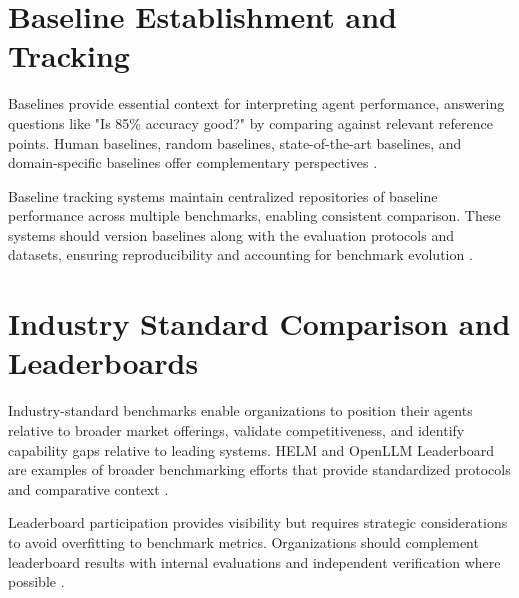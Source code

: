 \begin{TNtwocol}
\section{Baseline Establishment and Tracking}
Baselines provide essential context for interpreting agent performance, answering questions like "Is 85\% accuracy good?" by comparing against relevant reference points. Human baselines, random baselines, state-of-the-art baselines, and domain-specific baselines offer complementary perspectives \cite{liu2023,jimenez2024}.

Baseline tracking systems maintain centralized repositories of baseline performance across multiple benchmarks, enabling consistent comparison. These systems should version baselines along with the evaluation protocols and datasets, ensuring reproducibility and accounting for benchmark evolution \cite{liu2023}.

\section{Industry Standard Comparison and Leaderboards}
Industry-standard benchmarks enable organizations to position their agents relative to broader market offerings, validate competitiveness, and identify capability gaps relative to leading systems. HELM and OpenLLM Leaderboard are examples of broader benchmarking efforts that provide standardized protocols and comparative context \cite{liang2023,liu2023}.

Leaderboard participation provides visibility but requires strategic considerations to avoid overfitting to benchmark metrics. Organizations should complement leaderboard results with internal evaluations and independent verification where possible \cite{liang2023,liu2023}.
\end{TNtwocol}
